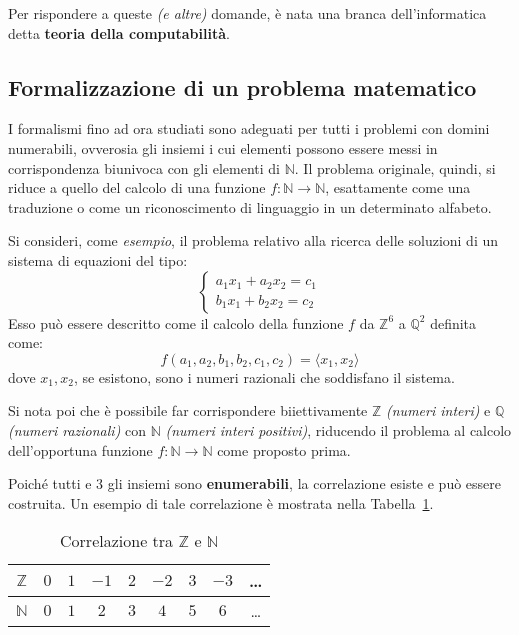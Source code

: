\documentclass[italian, 10pt]{article}
\begin{document}
Per rispondere a queste \textit{(e altre)} domande, è nata una branca dell'informatica detta \textbf{teoria della computabilità}.

\subsection{Formalizzazione di un problema matematico}

I formalismi fino ad ora studiati sono adeguati per tutti i problemi con domini numerabili, ovverosia gli insiemi i cui elementi possono essere messi in corrispondenza biunivoca con gli elementi di \(\mathbb{N}\).
Il problema originale, quindi, si riduce a quello del calcolo di una funzione \(f: \mathbb{N} \rightarrow \mathbb{N}\), esattamente come una traduzione o come un riconoscimento di linguaggio in un determinato alfabeto.

\bigskip
Si consideri, come \textit{esempio}, il problema relativo alla ricerca delle soluzioni di un sistema di equazioni del tipo:
\[\begin{cases}
    a_1 x_1 + a_2 x_2 = c_1 \\
    b_1 x_1 + b_2 x_2 = c_2
  \end{cases}\]
Esso può essere descritto come il calcolo della funzione \(f\) da \(\mathbb{Z}^6\) a \(\mathbb{Q}^2\) definita come:
\[ f(a_1, a_2, b_1, b_2, c_1, c_2) = \langle x_1, x_2 \rangle \]
dove \(x_1, x_2\), se esistono, sono i numeri razionali che soddisfano il sistema.

Si nota poi che è possibile far corrispondere biiettivamente \(\mathbb{Z}\) \textit{(numeri interi)} e \(\mathbb{Q}\) \textit{(numeri razionali)}  con \(\mathbb{N}\)  \textit{(numeri interi positivi)}, riducendo il problema al calcolo dell'opportuna funzione \(f: \mathbb{N} \rightarrow \mathbb{N}\) come proposto prima.

Poiché tutti e \(3\) gli insiemi sono \textbf{enumerabili}, la correlazione esiste e può essere costruita.
Un esempio di tale correlazione è mostrata nella Tabella~\ref{tab:correlazione-z-n}.

\begin{table}[htbp]
  \bigskip
  \centering
  \begin{tabular}{c|cccccccc}
    \(\mathbb{Z}\) & \(0\) & \(1\) & \(-1\) & \(2\) & \(-2\) & \(3\) & \(-3\) & \dots \\ \hline
    \(\mathbb{N}\) & \(0\) & \(1\) & \(2\)  & \(3\) & \(4\)  & \(5\) & \(6\)  & \dots \\
  \end{tabular}
  \bigskip
  \caption{Correlazione tra \(\mathbb{Z}\) e \(\mathbb{N}\)}
  \label{tab:correlazione-z-n}
\end{table}
\end{document}
